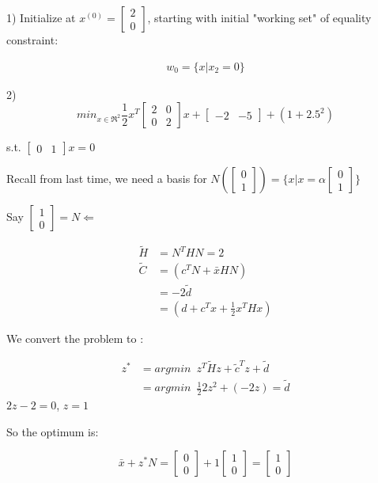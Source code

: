 1) Initialize at $x^{(0)} = \begin{bmatrix}
2\\
0
\end{bmatrix}$, starting with initial "working set" of equality constraint:

\begin{eqnarray}
w_0 = \{x|x_2 = 0 \}
\end{eqnarray}


2) \begin{equation*}
min_{x\in \Re^2} \frac{1}{2}x^T\begin{bmatrix}
2&0\\
0&2
\end{bmatrix}x + \begin{bmatrix}
-2 & -5
\end{bmatrix} + (1 + 2.5^2)
\end{equation*}

s.t. $\begin{bmatrix}
	0  & 1
\end{bmatrix}x = 0$

Recall from last time, we need a basis for $N(\begin{bmatrix}
0\\
1
\end{bmatrix}) = \{x|x = \alpha\begin{bmatrix}
0\\
1
\end{bmatrix} \}$

Say $\begin{bmatrix}
1\\
0
\end{bmatrix} = N\Leftarrow$

\begin{align*}
\tilde{H} &= N^THN = 2\\
\tilde{C} &= (c^TN + \bar{x}HN)\\
&= -2\tilde{d}\\
&= (d+c^Tx + \frac{1}{2}x^THx)
\end{align*}

We convert the problem to :

\begin{align*}
z^* &= argmin\,\,\, z^T\tilde{H}z + \tilde{c}^Tz + \tilde{d}\\
&= argmin\,\,\, \frac{1}{2}2z^2 + (-2z) = \tilde{d}
\end{align*}
 $2z - 2 = 0$, $z = 1$

So the optimum is:

\begin{equation*}
\bar{x}+ z^*N = \begin{bmatrix}
0\\
0
\end{bmatrix} + 1
\begin{bmatrix}
1\\
0
\end{bmatrix} = 
\begin{bmatrix}
1\\
0
\end{bmatrix}
\end{equation*}

